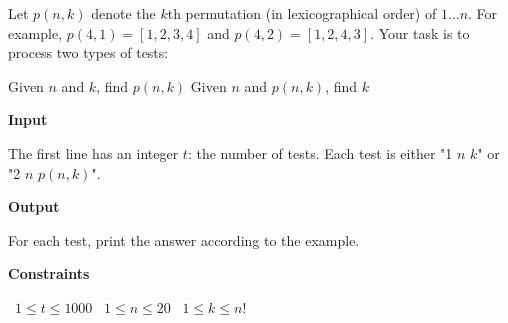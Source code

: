 Let $p(n,k)$ denote the $k$th permutation (in lexicographical order) of $1 \dots n$. For example, $p(4,1)=[1,2,3,4]$ and $p(4,2)=[1,2,4,3]$.
Your task is to process two types of tests:

Given $n$ and $k$, find $p(n,k)$
Given $n$ and $p(n,k)$, find $k$

\vspace{0.3cm}\noindent\textbf{Input}

The first line has an integer $t$: the number of tests.
Each test is either "1 $n$ $k$" or "2 $n$ $p(n,k)$".

\vspace{0.3cm}\noindent\textbf{Output}

For each test, print the answer according to the example.

\vspace{0.3cm}\noindent\textbf{Constraints}

\textbullet\ $1 \le t \le 1000$
\textbullet\ $1 \le n \le 20$
\textbullet\ $1 \le k \le n!$